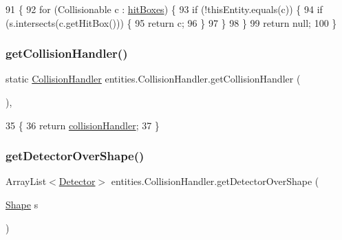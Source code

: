 \begin{DoxyCode}
91                                                                                       \{
92         \textcolor{keywordflow}{for} (Collisionable c : \mbox{\hyperlink{classentities_1_1_collision_handler_a4a3eab5e53bb34f16026644c4d7c0595}{hitBoxes}}) \{
93             \textcolor{keywordflow}{if} (!thisEntity.equals(c)) \{
94                 \textcolor{keywordflow}{if} (s.intersects(c.getHitBox())) \{
95                     \textcolor{keywordflow}{return} c;
96                 \}
97             \}
98         \}
99         \textcolor{keywordflow}{return} null;
100     \}
\end{DoxyCode}
\mbox{\label{classentities_1_1_collision_handler_a40a5776ef3782f3bfe037085dc1c10cf}} 
\subsubsection{\texorpdfstring{get\+Collision\+Handler()}{getCollisionHandler()}}
{\footnotesize\ttfamily static \mbox{\hyperlink{classentities_1_1_collision_handler}{Collision\+Handler}} entities.\+Collision\+Handler.\+get\+Collision\+Handler (\begin{DoxyParamCaption}{ }\end{DoxyParamCaption})\hspace{0.3cm}{\ttfamily [inline]}, {\ttfamily [static]}}


\begin{DoxyCode}
35                                                          \{
36         \textcolor{keywordflow}{return} \mbox{\hyperlink{classentities_1_1_collision_handler_a4ab7151e81e4b5e7e5bd99bf72f2dc3a}{collisionHandler}};
37     \}
\end{DoxyCode}
\mbox{\label{classentities_1_1_collision_handler_ac09d2b1b7fff6e7dd141d09322beb922}} 
\subsubsection{\texorpdfstring{get\+Detector\+Over\+Shape()}{getDetectorOverShape()}}
{\footnotesize\ttfamily Array\+List$<$\mbox{\hyperlink{interfacedetectors_1_1_detector}{Detector}}$>$ entities.\+Collision\+Handler.\+get\+Detector\+Over\+Shape (\begin{DoxyParamCaption}\item[{\mbox{\hyperlink{classorg_1_1newdawn_1_1slick_1_1geom_1_1_shape}{Shape}}}]{s }\end{DoxyParamCaption})\hspace{0.3cm}{\ttfamily [inline]}}

